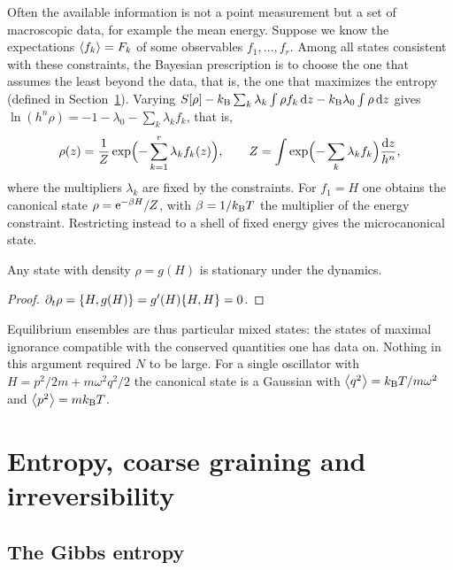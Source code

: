 Often the available information is not a point measurement but a set of macroscopic data, for example the mean energy. Suppose we know the expectations $\left\langle f_k\right\rangle=F_k$ of some observables $f_1,\dots,f_r$. Among all states consistent with these constraints, the Bayesian prescription is to choose the one that assumes the least beyond the data, that is, the one that maximizes the entropy (defined in Section~\ref{sec:entropy}). Varying
$S[\rho]-k_{\mathrm B}\sum_k\lambda_k\int\rho f_k\,\mathrm{d} z-k_{\mathrm B}\lambda_0\int\rho\,\mathrm{d} z$ gives $\ln(h^n\rho)=-1-\lambda_0-\sum_k\lambda_kf_k$, that is,
\begin{equation}
\rho(z)=\frac1{Z}\exp\Bigl(-\sum_{k=1}^r\lambda_kf_k(z)\Bigr),\qquad Z=\int\exp\Bigl(-\sum_k\lambda_kf_k\Bigr)\frac{\mathrm{d} z}{h^n},
\label{eq:maxent}
\end{equation}
where the multipliers $\lambda_k$ are fixed by the constraints. For $f_1=H$ one obtains the canonical state $\rho=\mathrm{e}^{-\beta H}/Z$, with $\beta=1/k_{\mathrm B} T$ the multiplier of the energy constraint. Restricting instead to a shell of fixed energy gives the microcanonical state.

\begin{proposition}\label{prop:stationary}
Any state with density $\rho=g(H)$ is stationary under the dynamics.
\end{proposition}

\begin{proof}
$\partial_t\rho=\{H,g(H)\}=g'(H)\{H,H\}=0$.
\end{proof}

Equilibrium ensembles are thus particular mixed states: the states of maximal ignorance compatible with the conserved quantities one has data on. Nothing in this argument required $N$ to be large. For a single oscillator with $H=p^2/2m+m\omega^2q^2/2$ the canonical state is a Gaussian with $\left\langle q^2\right\rangle=k_{\mathrm B} T/m\omega^2$ and $\left\langle p^2\right\rangle=mk_{\mathrm B} T$.

\section{Entropy, coarse graining and irreversibility}
\label{sec:entropy}

\subsection{The Gibbs entropy}

